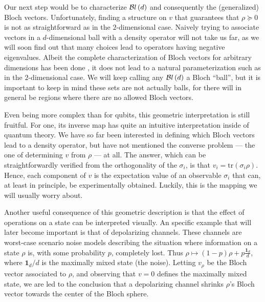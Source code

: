 		
		Our next step would be to characterize $\mathcal{B}l\left( d \right)$ and consequently the (generalized) Bloch vectors. Unfortunately, finding a structure on $v$ that guarantees that $\rho \succeq 0$ is not as straightforward as in the $2$-dimensional case. Naively trying to associate vectors in a $d$-dimensional ball with a density operator will not take us far, as we will soon find out that many choices lead to operators having negative eigenvalues. Albeit the complete characterization of Bloch vectors for arbitrary dimensions has been done \cite{kimura_2003_bloch}, it does not lead to a natural parameterization such as in the $2$-dimensional case. We will keep calling any $\mathcal{B}l\left( d \right)$ a Bloch ``ball'', but it is important to keep in mind these sets are not actually balls, for there will in general be regions where there are no allowed Bloch vectors.

		Even being more complex than for qubits, this geometric interpretation is still fruitful. For one, its inverse map has quite an intuitive interpretation inside of quantum theory. We have so far been interested in defining which Bloch vectors lead to a density operator, but have not mentioned the converse problem --- the one of determining $v$ from $\rho$ --- at all. The answer, which can be straightforwardly verified from the orthogonality of the $\sigma_i$, is that $v_i = \text{tr}(\sigma_i \rho)$. Hence, each component of $v$ is the expectation value of an observable $\sigma_i$ that can, at least in principle, be experimentally obtained. Luckily, this is the mapping we will usually worry about.

		Another useful consequence of this geometric description is that the effect of operations on a state can be interpreted visually. An specific example that will later become important is that of depolarizing channels. These channels are worst-case scenario noise models describing the situation where information on a state $\rho$ is, with some probability $p$, completely lost. Thus $\rho \mapsto (1 - p) \rho + p \frac{\mathbf{1}_d}{d}$, where $\mathbf{1}_d/d$ is the maximally mixed state (the noise). Letting $v_\rho$ be the Bloch vector associated to $\rho$, and observing that $v = 0$ defines the maximally mixed state, we are led to the conclusion that a depolarizing channel shrinks $\rho$'s Bloch vector towards the center of the Bloch sphere.

